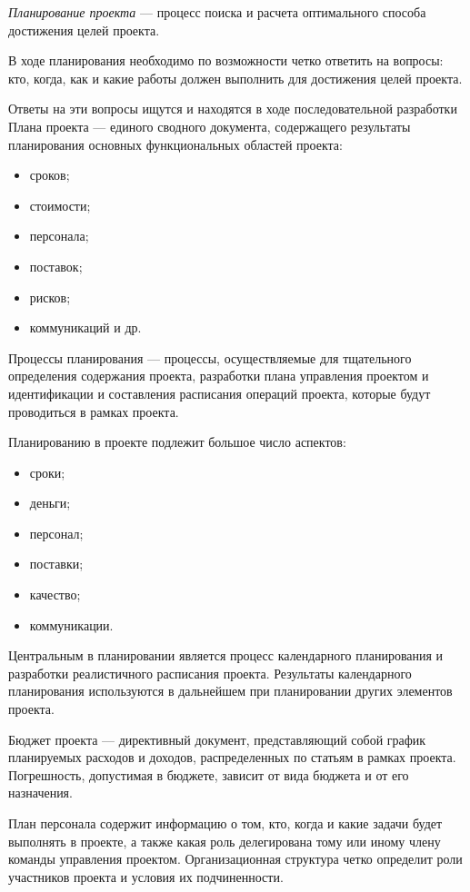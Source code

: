 \textit{Планирование проекта} --- процесс поиска и расчета оптимального способа достижения целей проекта.

В ходе планирования необходимо по воз­можности четко ответить на вопросы: кто, когда, как и какие работы должен выпол­нить для достижения целей проекта.

Ответы на эти вопросы ищутся и находятся в ходе последовательной разработки Плана проекта --- единого сводного документа, со­держащего результаты планирования основ­ных функциональных областей проекта:
\begin{itemize}
	\item сроков;
	\item стоимости;
	\item персонала;
	\item поставок;
	\item рисков;
	\item коммуникаций и др.
\end{itemize}

Процессы планирования --- процессы, осуществляемые для тщательного определения содержания проекта, разработки плана управления проектом и идентификации и составления расписания операций проекта, которые будут проводиться в рамках проекта.

Планированию в проекте подлежит большое число аспектов:
\begin{itemize}
	\item сроки;
	\item деньги;
	\item персонал;
	\item поставки;
	\item качество;
	\item коммуникации.
\end{itemize}

Центральным в планировании является процесс календарного плани­рования и разработки реалистичного расписания проекта.
Результаты календарного планирования используются в дальнейшем при плани­ровании других элементов проекта.

Бюджет проекта --- директивный документ, представляющий собой график планируемых расходов и доходов, распределенных по статьям в рамках проекта.
Погрешность, допустимая в бюджете, зависит от вида бюджета и от его назначения.

План персонала содержит информацию о том, кто, когда и какие за­дачи будет выполнять в проекте, а также какая роль делегирована тому или иному члену команды управления проектом.
Организацион­ная структура четко определит роли участников проекта и условия их подчиненности.

